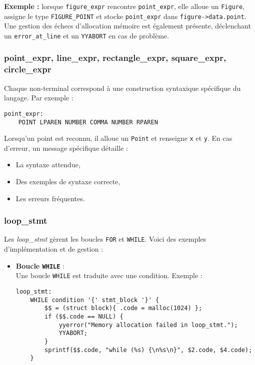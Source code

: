 \documentclass[12pt,a4paper]{article}
\begin{document}
\textbf{Exemple :} lorsque \texttt{figure\_expr} rencontre \texttt{point\_expr}, elle alloue un \texttt{Figure}, assigne le type \texttt{FIGURE\_POINT} et stocke \texttt{point\_expr} dans \texttt{figure->data.point}. Une gestion des échecs d’allocation mémoire est également présente, déclenchant un \texttt{error\_at\_line} et un \texttt{YYABORT} en cas de problème.

\subsubsection{point\_expr, line\_expr, rectangle\_expr, square\_expr, circle\_expr}
Chaque non-terminal correspond à une construction syntaxique spécifique du langage. Par exemple :

\begin{verbatim}
point_expr:
    POINT LPAREN NUMBER COMMA NUMBER RPAREN
\end{verbatim}

Lorsqu’un point est reconnu, il alloue un \texttt{Point} et renseigne \texttt{x} et \texttt{y}. En cas d’erreur, un message spécifique détaille :
\begin{itemize}
    \item La syntaxe attendue,
    \item Des exemples de syntaxe correcte,
    \item Les erreurs fréquentes.
\end{itemize}

\subsubsection{loop\_stmt}
Les \textit{loop\_stmt} gèrent les boucles \texttt{FOR} et \texttt{WHILE}. Voici des exemples d’implémentation et de gestion :

\begin{itemize}

\item \textbf{Boucle \texttt{WHILE}} : \\
    Une boucle \texttt{WHILE} est traduite avec une condition. Exemple :
\begin{verbatim}
loop_stmt:
    WHILE condition '{' stmt_block '}' {
        $$ = (struct block){ .code = malloc(1024) };
        if ($$.code == NULL) {
            yyerror("Memory allocation failed in loop_stmt.");
            YYABORT;
        }
        sprintf($$.code, "while (%s) {\n%s\n}", $2.code, $4.code);
    }
\end{verbatim}
\end{itemize}
\end{document}
